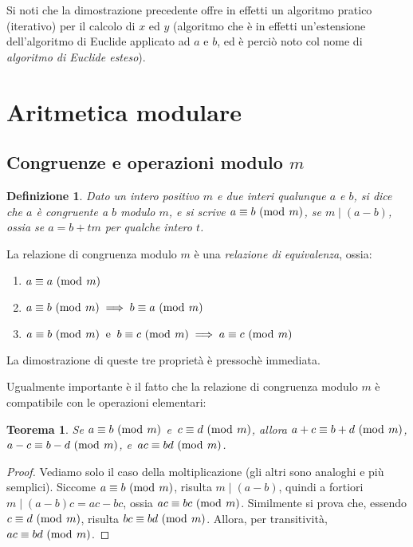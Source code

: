 \documentclass[pdflatex,11pt,a4paper,oneside]{article}
\newcommand{\p}[1]{\left({#1}\right)}
\newcommand{\divides}[0]{\mid}
\newcommand{\congruent}[0]{\equiv}
\newcommand{\mmodop}[0]{\ensuremath{\operatorname{mod}}}
\newcommand{\mmod}[1]{\ensuremath{\allowbreak\ (\mmodop\:{#1})}}
\newtheorem{theorem}[TheoremLike]{Teorema}
\newtheorem{definition}[TheoremLike]{Definizione}
\begin{document}
Si noti che la dimostrazione precedente offre in effetti un algoritmo
pratico (iterativo) per il calcolo di  $x$ ed $y$ (algoritmo che \`e in
effetti un'estensione dell'algoritmo di Euclide applicato ad $a$ e $b$,
ed \`e perci\`o noto col nome di \emph{algoritmo di Euclide esteso}).


\section{Aritmetica modulare}


\subsection{Congruenze e operazioni modulo $m$}

\begin{definition}
Dato un intero positivo $m$ e due interi qualunque $a$ e $b$, si dice che
\emph{$a$ \`e congruente a $b$ modulo $m$}, e si scrive $a \congruent b
\mmod m$, se $m \divides \p{a - b}$, ossia se $a = b + tm$ per qualche
intero $t$.
\end{definition}

La relazione di congruenza modulo $m$ \`e una \emph{relazione di
equivalenza}, ossia:
\begin{enumerate}
\item $a \congruent a \mmod m$
\item $a \congruent b \mmod m \implies b \congruent a \mmod m$
\item $a \congruent b \mmod m ~\:\textrm{e}\:~
       b \congruent c \mmod m \implies
       a \congruent c \mmod m$
\end{enumerate}
La dimostrazione di queste tre propriet\`a \`e pressoch\`e immediata.

\smallskip
Ugualmente importante \`e il fatto che la relazione di congruenza
modulo $m$ \`e compatibile con le operazioni elementari:
%
\begin{theorem}
Se $a \congruent b \mmod m$ e\, $c \congruent d \mmod m$, allora
$a + c \congruent b + d \mmod m$, $a - c \congruent b - d \mmod m$,
e\, $ac \congruent bd \mmod m$.
\end{theorem}
%
\begin{proof}
Vediamo solo il caso della moltiplicazione (gli altri sono analoghi
e pi\`u semplici).  Siccome $a \congruent b \mmod m$, risulta
$m \divides \p{a - b}$, quindi a fortiori $m \divides \p{a - b}c =
ac - bc$, ossia $ac \congruent bc \mmod m$.  Similmente si prova
che, essendo $c \congruent d \mmod m$, risulta $bc \congruent bd
\mmod m$.  Allora, per transitivit\`a, $ac \congruent bd \mmod m$.
\end{proof}
\end{document}
